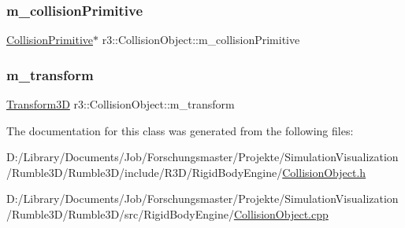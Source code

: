 \subsubsection{\texorpdfstring{m\+\_\+collision\+Primitive}{m\_collisionPrimitive}}
{\footnotesize\ttfamily \mbox{\hyperlink{classr3_1_1_collision_primitive}{Collision\+Primitive}}$\ast$ r3\+::\+Collision\+Object\+::m\+\_\+collision\+Primitive\hspace{0.3cm}{\ttfamily [protected]}}

\mbox{\label{classr3_1_1_collision_object_a2ed717150a250f1b81e23ba7e5431542}} 
\subsubsection{\texorpdfstring{m\+\_\+transform}{m\_transform}}
{\footnotesize\ttfamily \mbox{\hyperlink{classr3_1_1_transform3_d}{Transform3D}} r3\+::\+Collision\+Object\+::m\+\_\+transform\hspace{0.3cm}{\ttfamily [protected]}}



The documentation for this class was generated from the following files\+:\begin{DoxyCompactItemize}
\item 
D\+:/\+Library/\+Documents/\+Job/\+Forschungsmaster/\+Projekte/\+Simulation\+Visualization/\+Rumble3\+D/\+Rumble3\+D/include/\+R3\+D/\+Rigid\+Body\+Engine/\mbox{\hyperlink{_collision_object_8h}{Collision\+Object.\+h}}\item 
D\+:/\+Library/\+Documents/\+Job/\+Forschungsmaster/\+Projekte/\+Simulation\+Visualization/\+Rumble3\+D/\+Rumble3\+D/src/\+Rigid\+Body\+Engine/\mbox{\hyperlink{_collision_object_8cpp}{Collision\+Object.\+cpp}}\end{DoxyCompactItemize}
